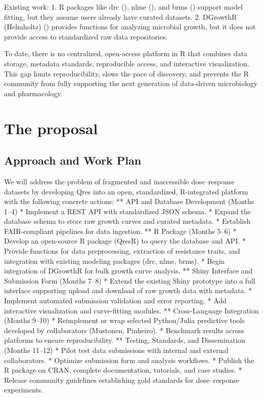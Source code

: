 \documentclass[
]{article}
\begin{document}
Existing work: 1. R packages like drc (), nlme (),
and brms () support model
fitting, but they assume users already have curated datasets. 2.
DGrowthR (Helmholtz) () provides functions for analyzing microbial growth, but it does
not provide access to standardized raw data repositories.

To date, there is no centralized, open-access platform in R that
combines data storage, metadata standards, reproducible access, and
interactive visualization. This gap limits reproducibility, slows the
pace of discovery, and prevents the R community from fully supporting
the next generation of data-driven microbiology and pharmacology.

\section{The proposal}\label{the-proposal}

\subsection{Approach and Work Plan}\label{approach-and-work-plan}

We will address the problem of fragmented and inaccessible
dose--response datasets by developing Qres into an open, standardized,
R-integrated platform with the following concrete actions: ** API and
Database Development (Months 1--4) * Implement a REST API with
standardized JSON schema. * Expand the database schema to store raw
growth curves and curated metadata. * Establish FAIR-compliant pipelines
for data ingestion. ** R Package (Months 5--6) * Develop an open-source
R package (QresR) to query the database and API. * Provide functions for
data preprocessing, extraction of resistance traits, and integration
with existing modeling packages (drc, nlme, brms). * Begin integration
of DGrowthR for bulk growth curve analysis. ** Shiny Interface and
Submission Form (Months 7--8) * Extend the existing Shiny prototype into
a full interface supporting upload and download of raw growth data with
metadata. * Implement automated submission validation and error
reporting. * Add interactive visualization and curve-fitting modules. **
Cross-Language Integration (Months 9--10) * Reimplement or wrap selected
Python/Julia predictive tools developed by collaborators (Mustonen,
Pinheiro). * Benchmark results across platforms to ensure
reproducibility. ** Testing, Standards, and Dissemination (Months
11--12) * Pilot test data submissions with internal and external
collaborators. * Optimize submission form and analysis workflows. *
Publish the R package on CRAN, complete documentation, tutorials, and
case studies. * Release community guidelines establishing gold standards
for dose--response experiments.
\end{document}
